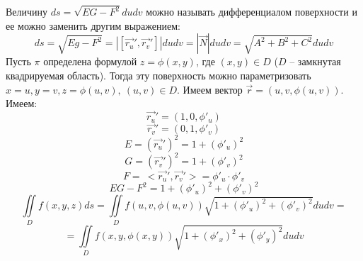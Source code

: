 \documentclass[../../main.tex]{subfiles}
\begin{document}
    \begin{rem}
    Величину $ds = \sqrt{EG - F^2} du dv$ можно называть
     дифференциалом поверхности и ее можно заменить другим выражением:
    \[ds = \sqrt{Eg - F^2} = |[\overrightarrow{r_u}', \overrightarrow{r_v}']| du dv =
     |\overrightarrow{N}| du dv = \sqrt{A^2 + B^2 + C^2} du dv \] 	
    Пусть $\pi$ определена формулой $z= \phi(x,y)$, где $(x,y) \in D$ ($D$ \---
     замкнутая квадрируемая область). Тогда эту поверхность можно параметризовать
      $x=u, y = v, z= \phi(u,v), \ (u, v) \in D$. Имеем вектор $\overrightarrow{r} =
       (u, v, \phi(u,v))$. Имеем:
    \[\overrightarrow{r_u}' = (1, 0, \phi'_u) \] 
    \[\overrightarrow{r_v}' = (0, 1, \phi'_v)\]
	\[E =(\overrightarrow{r_u}')^2 = 1 + (\phi'_u)^2\]
	\[G =(\overrightarrow{r_v}')^2 = 1 + (\phi'_v)^2\]
	\[F = \ <\overrightarrow{r_u}', \overrightarrow{r_v}'> = \phi'_u \cdot \phi'_v\]
	\[EG - F^2 = 1 + (\phi'_u)^2 + (\phi'_v)^2 \]
	\[\iint \limits_D f(x, y, z)ds = \iint \limits_D f(u,v, \phi(u,v)) \sqrt{1 +
		 (\phi'_u)^2 + (\phi'_v)^2} dudv = \] \[= \iint \limits_D f(x,y, \phi(x,y))
	  \sqrt{1 + (\phi'_x)^2 + (\phi'_y)^2} dudv \]
	\end{rem}
\end{document}
